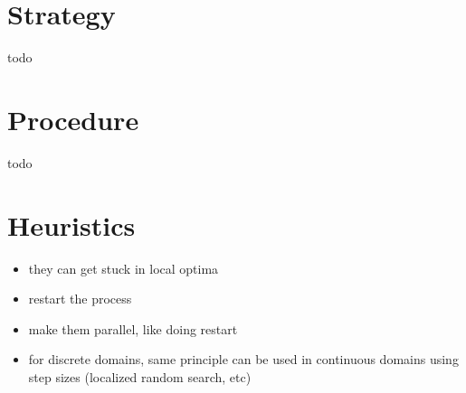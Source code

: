 \documentclass[a4paper, 11pt]{article}
\begin{document}
\section{Strategy}
\label{sec:strategy}
todo

\section{Procedure}
\label{sec:procedure}
todo

\section{Heuristics}
\label{sec:heuristics}
\begin{itemize}
	\item they can get stuck in local optima
	\item restart the process
	\item make them parallel, like doing restart
	\item for discrete domains, same principle can be used in continuous domains using step sizes (localized random search, etc)
\end{itemize}
\end{document}

